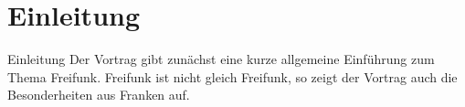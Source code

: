 \section{Einleitung}

\begin{frame}{Einleitung}
Der Vortrag gibt zunächst eine kurze allgemeine Einführung zum Thema
Freifunk. Freifunk ist nicht gleich Freifunk, so zeigt der Vortrag
auch die Besonderheiten aus Franken auf.
\end{frame}
